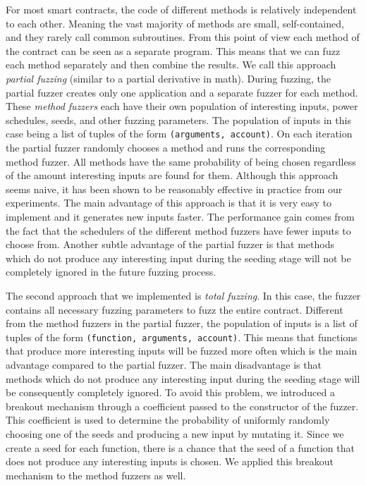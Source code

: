 For most smart contracts, the code of different methods is relatively independent to each other.
Meaning the vast majority of methods are small, self-contained, and they rarely call common subroutines.
From this point of view each method of the contract can be seen as a separate program.
This means that we can fuzz each method separately and then combine the results.
We call this approach \textit{partial fuzzing} (similar to a partial derivative in math).
During fuzzing, the partial fuzzer creates only one application and a separate fuzzer for each method.
These \textit{method fuzzers} each have their own population of interesting inputs, power schedules, seeds, and other fuzzing parameters.
The population of inputs in this case being a list of tuples of the form \texttt{(arguments, account)}.
On each iteration the partial fuzzer randomly chooses a method and runs the corresponding method fuzzer.
All methods have the same probability of being chosen regardless of the amount interesting inputs are found for them.
Although this approach seems naive, it has been shown to be reasonably effective in practice from our experiments.
The main advantage of this approach is that it is very easy to implement and it generates new inputs faster.
The performance gain comes from the fact that the schedulers of the different method fuzzers have fewer inputs to choose from.
Another subtle advantage of the partial fuzzer is that methods which do not produce any interesting input during the seeding stage will not be completely ignored in the future fuzzing process.

The second approach that we implemented is \textit{total fuzzing}.
In this case, the fuzzer contains all necessary fuzzing parameters to fuzz the entire contract.
Different from the method fuzzers in the partial fuzzer, the population of inputs is a list of tuples of the form \texttt{(function, arguments, account)}.
This means that functions that produce more interesting inputs will be fuzzed more often which is the main advantage compared to the partial fuzzer.
The main disadvantage is that methods which do not produce any interesting input during the seeding stage will be consequently completely ignored.
To avoid this problem, we introduced a breakout mechanism through a coefficient passed to the constructor of the fuzzer.
This coefficient is used to determine the probability of uniformly randomly choosing one of the seeds and producing a new input by mutating it.
Since we create a seed for each function, there is a chance that the seed of a function that does not produce any interesting inputs is chosen.
We applied this breakout mechanism to the method fuzzers as well.



